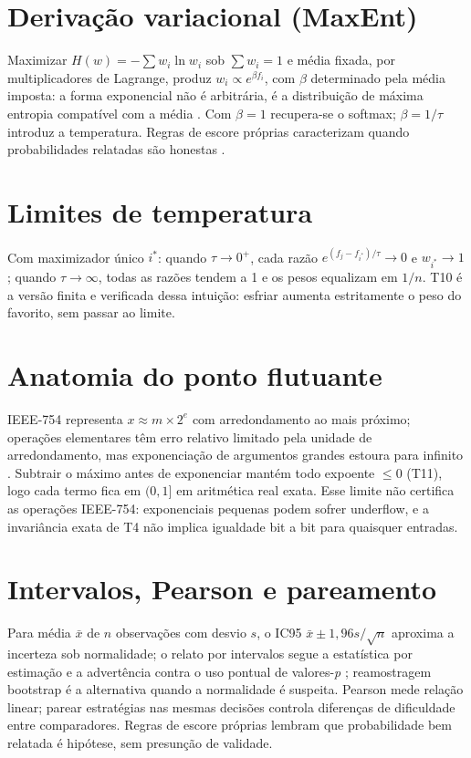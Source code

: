 \documentclass[12pt,openany,oneside,a4paper,brazil,chapter=TITLE]{abntex2}
\let\cite\citep
\begin{document}


\section{Derivação variacional (MaxEnt)}
Maximizar $H(w)=-\sum w_i\ln w_i$ sob $\sum w_i=1$ e média fixada, por multiplicadores de Lagrange, produz $w_i\propto e^{\beta f_i}$, com $\beta$ determinado pela média imposta: a forma exponencial não é arbitrária, é a distribuição de máxima entropia compatível com a média \cite{jaynes1957,shannon1948}. Com $\beta=1$ recupera-se o softmax; $\beta=1/\tau$ introduz a temperatura. Regras de escore próprias caracterizam quando probabilidades relatadas são honestas \cite{gneiting2007}.
\section{Limites de temperatura}
Com maximizador único $i^*$: quando $\tau\to0^+$, cada razão $e^{(f_j-f_{i^*})/\tau}\to0$ e $w_{i^*}\to1$; quando $\tau\to\infty$, todas as razões tendem a 1 e os pesos equalizam em $1/n$. T10 é a versão finita e verificada dessa intuição: esfriar aumenta estritamente o peso do favorito, sem passar ao limite.
\section{Anatomia do ponto flutuante}
IEEE-754 representa $x\approx m\times2^e$ com arredondamento ao mais próximo; operações elementares têm erro relativo limitado pela unidade de arredondamento, mas exponenciação de argumentos grandes estoura para infinito \cite{goldberg1991,muller2018}. Subtrair o máximo antes de exponenciar mantém todo expoente $\leq0$ (T11), logo cada termo fica em $(0,1]$ em aritmética real exata. Esse limite não certifica as operações IEEE-754: exponenciais pequenas podem sofrer underflow, e a invariância exata de T4 não implica igualdade bit a bit para quaisquer entradas.
\section{Intervalos, Pearson e pareamento}
Para média $\bar{x}$ de $n$ observações com desvio $s$, o IC95 $\bar{x}\pm1{,}96s/\sqrt{n}$ aproxima a incerteza sob normalidade; o relato por intervalos segue a estatística por estimação \cite{cumming2014} e a advertência contra o uso pontual de valores-\textit{p} \cite{wasserstein2016}; reamostragem bootstrap \cite{efron1979} é a alternativa quando a normalidade é suspeita. Pearson mede relação linear; parear estratégias nas mesmas decisões controla diferenças de dificuldade entre comparadores. Regras de escore próprias \cite{gneiting2007} lembram que probabilidade bem relatada é hipótese, sem presunção de validade.
\end{document}
